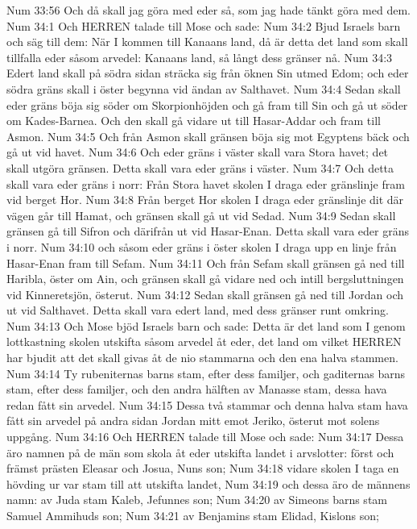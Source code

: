 Num 33:56  Och då skall jag göra med eder så, som jag hade tänkt göra med dem.
Num 34:1  Och HERREN talade till Mose och sade:
Num 34:2  Bjud Israels barn och säg till dem: När I kommen till Kanaans land, då är detta det land som skall tillfalla eder såsom arvedel: Kanaans land, så långt dess gränser nå.
Num 34:3  Edert land skall på södra sidan sträcka sig från öknen Sin utmed Edom; och eder södra gräns skall i öster begynna vid ändan av Salthavet.
Num 34:4  Sedan skall eder gräns böja sig söder om Skorpionhöjden och gå fram till Sin och gå ut söder om Kades-Barnea. Och den skall gå vidare ut till Hasar-Addar och fram till Asmon.
Num 34:5  Och från Asmon skall gränsen böja sig mot Egyptens bäck och gå ut vid havet.
Num 34:6  Och eder gräns i väster skall vara Stora havet; det skall utgöra gränsen. Detta skall vara eder gräns i väster.
Num 34:7  Och detta skall vara eder gräns i norr: Från Stora havet skolen I draga eder gränslinje fram vid berget Hor.
Num 34:8  Från berget Hor skolen I draga eder gränslinje dit där vägen går till Hamat, och gränsen skall gå ut vid Sedad.
Num 34:9  Sedan skall gränsen gå till Sifron och därifrån ut vid Hasar-Enan. Detta skall vara eder gräns i norr.
Num 34:10  och såsom eder gräns i öster skolen I draga upp en linje från Hasar-Enan fram till Sefam.
Num 34:11  Och från Sefam skall gränsen gå ned till Haribla, öster om Ain, och gränsen skall gå vidare ned och intill bergsluttningen vid Kinneretsjön, österut.
Num 34:12  Sedan skall gränsen gå ned till Jordan och ut vid Salthavet. Detta skall vara edert land, med dess gränser runt omkring.
Num 34:13  Och Mose bjöd Israels barn och sade: Detta är det land som I genom lottkastning skolen utskifta såsom arvedel åt eder, det land om vilket HERREN har bjudit att det skall givas åt de nio stammarna och den ena halva stammen.
Num 34:14  Ty rubeniternas barns stam, efter dess familjer, och gaditernas barns stam, efter dess familjer, och den andra hälften av Manasse stam, dessa hava redan fått sin arvedel.
Num 34:15  Dessa två stammar och denna halva stam hava fått sin arvedel på andra sidan Jordan mitt emot Jeriko, österut mot solens uppgång.
Num 34:16  Och HERREN talade till Mose och sade:
Num 34:17  Dessa äro namnen på de män som skola åt eder utskifta landet i arvslotter: först och främst prästen Eleasar och Josua, Nuns son;
Num 34:18  vidare skolen I taga en hövding ur var stam till att utskifta landet,
Num 34:19  och dessa äro de männens namn: av Juda stam Kaleb, Jefunnes son;
Num 34:20  av Simeons barns stam Samuel Ammihuds son;
Num 34:21  av Benjamins stam Elidad, Kislons son;
